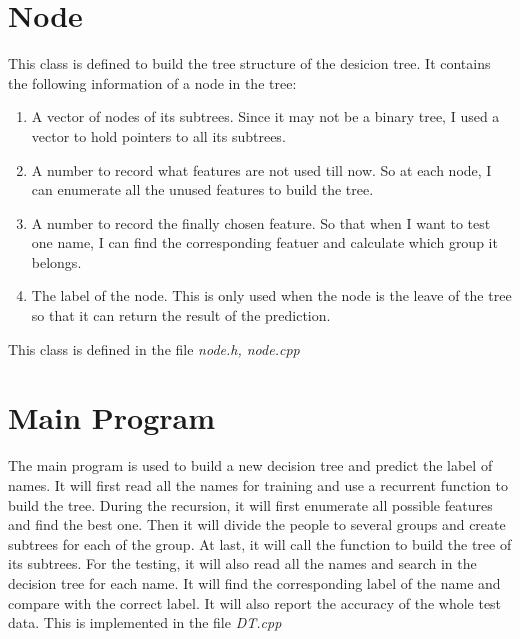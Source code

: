 \documentclass{article}
\begin{document}
	\section{Node}
		This class is defined to build the tree structure of the desicion tree. It contains the following information of a node in the tree:
		\begin{enumerate}
			\item A vector of nodes of its subtrees. Since it may not be a binary tree, I used a vector to hold pointers to all its subtrees.
			\item A number to record what features are not used till now. So at each node, I can enumerate all the unused features to build the tree.
			\item A number to record the finally chosen feature. So that when I want to test one name, I can find the corresponding featuer and calculate which group it belongs.
			\item The label of the node. This is only used when the node is the leave of the tree so that it can return the result of the prediction.
		\end{enumerate}
		This class is defined in the file \emph{node.h, node.cpp}
	\section{Main Program}
		The main program is used to build a new decision tree and predict the label of names. It will first read all the names for training and use a recurrent function to build the tree. During the recursion, it will first enumerate all possible features and find the best one. Then it will divide the people to several groups and create subtrees for each of the group. At last, it will call the function to build the tree of its subtrees. \newline
		For the testing, it will also read all the names and search in the decision tree for each name. It will find the corresponding label of the name and compare with the correct label. It will also report the accuracy of the whole test data.
		\newline
		This is implemented in the file \emph{DT.cpp}
\end{document}
